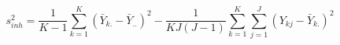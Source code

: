 

\[
s_{inh}^{2} = \frac{1}{K - 1} \sum_{k=1}^{K}{(\bar{Y}_{k.} - \bar{Y}_{..})^2} - \frac{1}{KJ(J-1)}\sum_{k=1}^{K}{\sum_{j=1}^{J}{(Y_{kj} - \bar{Y}_{k.})^2}}
\]


